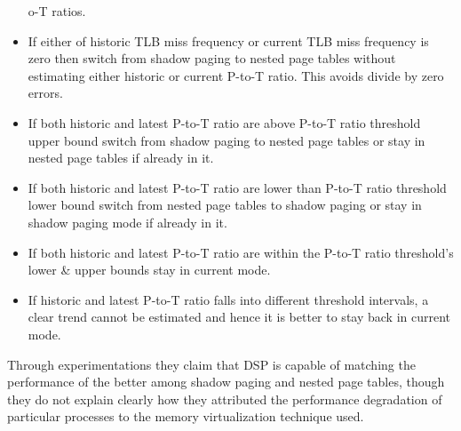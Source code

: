 \begin{itemize}
o-T ratios.
\item If either of historic TLB miss frequency or current TLB miss frequency is zero then switch
from shadow paging to nested page tables without estimating either historic or current P-to-T
ratio. This avoids divide by zero errors.
\item If both historic and latest P-to-T ratio are above P-to-T ratio threshold upper bound switch
from shadow paging to nested page tables or stay in nested page tables if already in it.
\item If both historic and latest P-to-T ratio are lower than P-to-T ratio threshold lower bound
switch from nested page tables to shadow paging or stay in shadow paging mode if already in it.
\item If both historic and latest P-to-T ratio are within the P-to-T ratio threshold's lower \&
upper bounds stay in current mode.
\item If historic and latest P-to-T ratio falls into different threshold intervals, a clear trend
cannot be estimated and hence it is better to stay back in current mode.     
\end{itemize}
Through experimentations they claim that DSP is capable of matching the performance of the better
among shadow paging and nested page tables, though they do not explain clearly how they attributed
the performance degradation of particular processes to the memory virtualization technique used.
